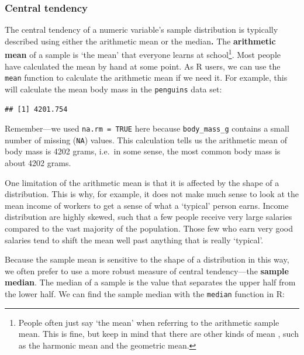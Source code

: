 \documentclass[
]{book}
\newenvironment{Shaded}{\begin{snugshade}}{\end{snugshade}}
\newcommand{\AttributeTok}[1]{\textcolor[rgb]{0.77,0.63,0.00}{#1}}
\newcommand{\ConstantTok}[1]{\textcolor[rgb]{0.00,0.00,0.00}{#1}}
\newcommand{\FunctionTok}[1]{\textcolor[rgb]{0.00,0.00,0.00}{#1}}
\newcommand{\NormalTok}[1]{#1}
\newcommand{\SpecialCharTok}[1]{\textcolor[rgb]{0.00,0.00,0.00}{#1}}
\begin{document}
\hypertarget{central-tendency}{%
\subsubsection{Central tendency}\label{central-tendency}}

The central tendency of a numeric variable's sample distribution is typically described using either the arithmetic mean or the median\textbf{.} The \textbf{arithmetic mean} of a sample is `the mean' that everyone learns at school\footnote{People often just say `the mean' when referring to the arithmetic sample mean. This is fine, but keep in mind that there are other kinds of mean , such as the harmonic mean and the geometric mean.}. Most people have calculated the mean by hand at some point. As R users, we can use the \texttt{mean} function to calculate the arithmetic mean if we need it. For example, this will calculate the mean body mass in the \texttt{penguins} data set:

\begin{Shaded}
\end{Shaded}

\begin{verbatim}
## [1] 4201.754
\end{verbatim}

Remember---we used \texttt{na.rm\ =\ TRUE} here because \texttt{body\_mass\_g} contains a small number of missing (\texttt{NA}) values. This calculation tells us the arithmetic mean of body mass is 4202 grams, i.e.~in some sense, the most common body mass is about 4202 grams.

One limitation of the arithmetic mean is that it is affected by the shape of a distribution. This is why, for example, it does not make much sense to look at the mean income of workers to get a sense of what a `typical' person earns. Income distribution are highly skewed, such that a few people receive very large salaries compared to the vast majority of the population. Those few who earn very good salaries tend to shift the mean well past anything that is really `typical'.

Because the sample mean is sensitive to the shape of a distribution in this way, we often prefer to use a more robust measure of central tendency---the \textbf{sample median}. The median of a sample is the value that separates the upper half from the lower half. We can find the sample median with the \texttt{median} function in R:
\end{document}
